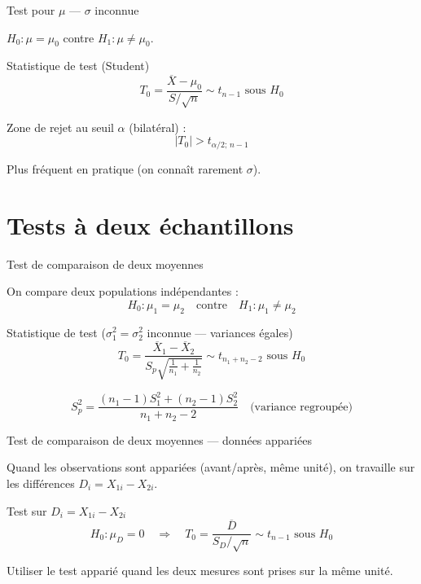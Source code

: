 \documentclass{BeamerTemplate}
\begin{document}
\begin{frame}[t]{Test pour $\mu$ — $\sigma$ inconnue}

$H_0 : \mu = \mu_0$ contre $H_1 : \mu \ne \mu_0$.

\bigskip
\begin{Boite}{Statistique de test (Student)}
$$T_0 = \frac{\overline{X} - \mu_0}{S/\sqrt{n}} \sim t_{n-1} \text{ sous } H_0$$
\end{Boite}

\medskip
Zone de rejet au seuil $\alpha$ (bilatéral) :
$$|T_0| > t_{\alpha/2;\, n-1}$$

\medskip
Plus fréquent en pratique (on connaît rarement $\sigma$).

\end{frame}

\section{Tests à deux échantillons}

\begin{frame}[t]{Test de comparaison de deux moyennes}

On compare deux populations indépendantes :
$$H_0 : \mu_1 = \mu_2 \quad \text{contre} \quad H_1 : \mu_1 \ne \mu_2$$

\bigskip
\begin{Boite}{Statistique de test ($\sigma_1^2 = \sigma_2^2$ inconnue — variances égales)}
$$T_0 = \frac{\overline{X}_1 - \overline{X}_2}{S_p\sqrt{\frac{1}{n_1}+\frac{1}{n_2}}} \sim t_{n_1+n_2-2} \text{ sous } H_0$$
\end{Boite}

$$S_p^2 = \frac{(n_1-1)S_1^2 + (n_2-1)S_2^2}{n_1+n_2-2} \quad \text{(variance regroupée)}$$

\end{frame}

\begin{frame}[t]{Test de comparaison de deux moyennes — données appariées}

Quand les observations sont appariées (avant/après, même unité), on travaille sur les \alert{différences} $D_i = X_{1i} - X_{2i}$.

\bigskip
\begin{Boite}{Test sur $D_i = X_{1i} - X_{2i}$}
$$H_0 : \mu_D = 0 \quad \Rightarrow \quad T_0 = \frac{\overline{D}}{S_D/\sqrt{n}} \sim t_{n-1} \text{ sous } H_0$$
\end{Boite}

\medskip
Utiliser le test apparié quand les deux mesures sont prises sur la \alert{même unité}.

\end{frame}
\end{document}
